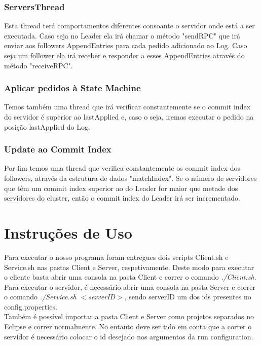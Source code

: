 \documentclass[12pt,a4paper]{report}
\begin{document}
\subsection{ServersThread}
Esta thread terá comportamentos diferentes consoante o servidor onde está a ser executada. Caso seja no Leader ela irá chamar o método "sendRPC" que irá enviar aos followers AppendEntries para cada pedido adicionado ao Log. Caso seja um follower ela irá receber e responder a esses AppendEntries através do método "receiveRPC".
\subsection{Aplicar pedidos à State Machine}
Temos também uma thread que irá verificar constantemente se o commit index do servidor é superior ao lastApplied e, caso o seja, iremos executar o pedido na posição lastApplied do Log.
\subsection{Update ao Commit Index}
Por fim temos uma thread que verifica constantemente os commit index dos followers, através da estrutura de dados "matchIndex". Se o número de servidores que têm um commit index superior ao do Leader for maior que metade dos servidores do cluster, então o commit index do Leader irá ser incrementado.

\chapter{Instruções de Uso}
Para executar o nosso programa foram entregues dois scripts Client.sh e Service.sh nas pastas Client e Server, respetivamente. Deste modo para executar o cliente basta abrir uma consola na pasta Client e correr o comando {\it ./Client.sh}.
Para executar o servidor, é necessário abrir uma consola na pasta Server e correr o comando {\it ./Service.sh $<$serverID$>$}, sendo serverID um dos ids presentes no config.properties.
\\
Também é possível importar a pasta Client e Server como projetos separados no Eclipse e correr normalmente. No entanto deve ser tido em conta que a correr o servidor é necessário colocar o id desejado nos argumentos da run configuration.
\end{document}
